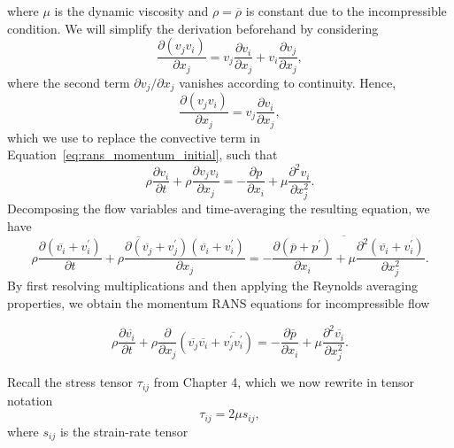 where $\mu$ is the dynamic viscosity and $\rho=\overline{\rho}$ is constant due to the incompressible condition. We will simplify the derivation beforehand by considering
\begin{equation}
    \frac{\partial \left(v_jv_i\right)}{\partial x_j} = v_j \frac{\partial v_i}{\partial x_j} + v_i \frac{\partial v_j}{\partial x_j},
\end{equation}
where the second term $\partial v_j/\partial x_j$ vanishes according to continuity. Hence,
\begin{equation}
    \frac{\partial \left(v_jv_i\right)}{\partial x_j} = v_j \frac{\partial v_i}{\partial x_j},
\end{equation}
which we use to replace the convective term in Equation~\ref{eq:rans_momentum_initial}, such that
\begin{equation}
    \rho\frac{\partial  v_i}{\partial t} + \rho\frac{\partial  v_j v_i}{\partial x_j} =
    - \frac{\partial p}{\partial x_i} + \mu \frac{\partial^2 v_i}{\partial x_j^2}.
\end{equation}
Decomposing the flow variables and time-averaging the resulting equation, we have
\begin{equation}
    \overline{ 
    \rho\frac{\partial  \left(\overline{v_i}+v_i^\prime\right)}{\partial t} 
    + \rho \frac{\partial  \left(\overline{v_j} + v_j^\prime\right)\left(\overline{v_i}+ v_i^\prime\right)}{\partial x_j}} = \overline{
     - \frac{\partial \left(\overline{p}+p^\prime\right)}{\partial x_i} 
    + \mu \frac{\partial^2 \left(\overline{v_i}
    +v_i^\prime\right)}{\partial x_j^2}}.
\end{equation}
By first resolving multiplications and then applying the Reynolds averaging properties, we obtain the momentum RANS equations for incompressible flow
\begin{eqBox}
\begin{equation}
    \rho \frac{\partial \overline{v_i}}{\partial t} 
    + \rho  \frac{\partial}{\partial x_j} \left(\overline{v_j}\overline{v_i} + \overline{v_j^\prime v_i^\prime}\right)
    =- \frac{\partial \overline{p}}{\partial x_i} 
    + \mu \frac{\partial^2 \overline{v_i}}{\partial x_j^2}.
\end{equation}
\end{eqBox}
Recall the stress tensor $\tau_{ij}$ from Chapter 4, which we now rewrite in tensor notation
\begin{equation}
    \tau_{ij} = 2\mu s_{ij},
\end{equation}
where $s_{ij}$ is the strain-rate tensor
